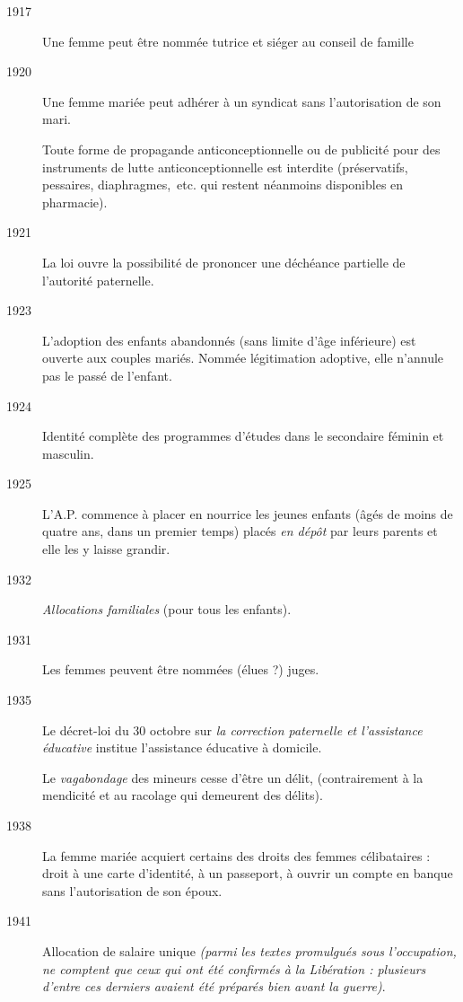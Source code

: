 \begin{description}
\item[1917] Une femme peut être nommée tutrice et siéger au conseil de famille

\item[1920] Une femme mariée peut adhérer à un syndicat sans l'autorisation de son mari.

Toute forme de propagande anticonceptionnelle ou de publicité pour des instruments de lutte anticonceptionnelle est interdite (préservatifs, pessaires, diaphragmes,~etc. qui restent néanmoins disponibles en pharmacie).

\item[1921] La loi ouvre la possibilité de prononcer une déchéance partielle de l'autorité paternelle. 

\item[1923] L'adoption des enfants abandonnés (sans limite d'âge inférieure) est ouverte aux couples mariés. Nommée légitimation adoptive, elle n'annule pas le passé de l'enfant.

\item[1924] Identité complète des programmes d'études dans le secondaire féminin et masculin.

\item[1925] L'A.P. commence à placer en nourrice les jeunes enfants (âgés de moins de quatre ans, dans un premier temps) placés \emph{en dépôt} par leurs parents et elle les y laisse grandir. 

\item[1932] \emph{Allocations familiales} (pour tous les enfants).

\item[1931] Les femmes peuvent être nommées (élues ?) juges.

\item[1935] Le décret-loi du 30 octobre sur {\emph{la correction paternelle et l'assistance éducative}} institue l'assistance éducative à domicile. 

Le \emph{vagabondage} des mineurs cesse d'être un délit, (contrairement à la mendicité et au racolage qui demeurent des délits). 

\item[1938] La femme mariée acquiert certains des droits des femmes célibataires : droit à une carte d'identité, à un passeport, à ouvrir un compte en banque sans l'autorisation de son époux.

\item[1941] Allocation de salaire unique \emph{(parmi les textes promulgués sous l'occupation, ne comptent que ceux qui ont été confirmés à la Libération : plusieurs d'entre ces derniers avaient été préparés bien avant la guerre)}. 


\end{description}
